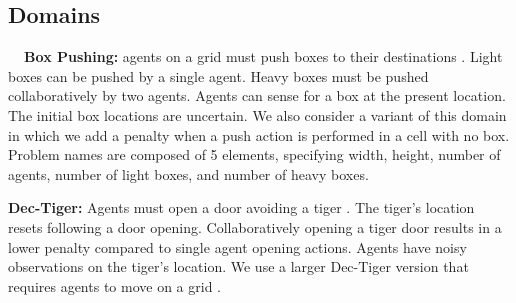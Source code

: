 \documentclass[runningheads]{llncs}
\newcommand{\citep}{\cite}
\newcommand{\cdt}[0]{Collaborative Dec-Tiger}
\begin{document}
\subsection{Domains}
{\bf \ \ Box Pushing:} agents on a grid must push boxes to their destinations \cite{carlin2008value,QDECPOMDP}. Light boxes can be pushed by a single agent. Heavy boxes must be pushed collaboratively by two agents. 
Agents can sense for a box at the present location. The initial box locations are uncertain. 
We also consider a variant of this domain in which we add a penalty when a push action is performed in a cell with
no box.
Problem names are composed of 5 elements, specifying
width, height, number of agents, number of light boxes, and number of heavy boxes.


{\bf Dec-Tiger:} 
Agents must open a door avoiding a tiger \cite{nair2003taming}. The tiger's location resets following a door opening. Collaboratively opening a tiger door results in a lower penalty compared to single agent opening actions. Agents have noisy observations on the tiger's location. We use a larger Dec-Tiger version that requires agents to move on a grid \cite{amato2010optimizing}.
\end{document}
